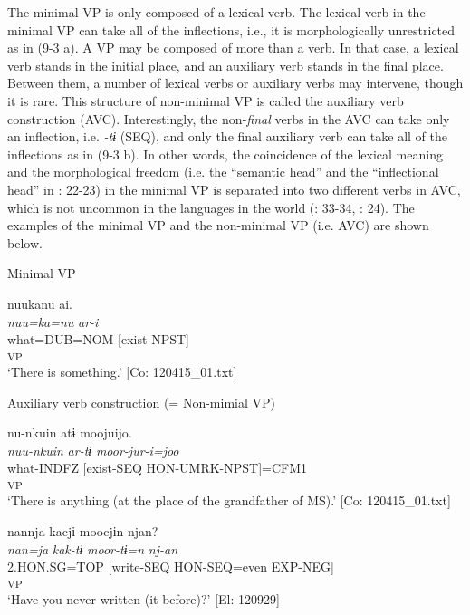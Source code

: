 The minimal VP is only composed of a lexical verb. The lexical verb in the minimal VP can take all of the inflections, i.e., it is morphologically unrestricted as in (9-3 a). A VP may be composed of more than a verb. In that case, a lexical verb stands in the initial place, and an auxiliary verb stands in the final place. Between them, a number of lexical verbs or auxiliary verbs may intervene, though it is rare. This structure of non-minimal VP is called the auxiliary verb construction (AVC). Interestingly, the non-\textit{final} verbs in the AVC can take only an inflection, i.e. \textit{{}-tɨ} (SEQ), and only the final auxiliary verb can take all of the inflections as in (9-3 b). In other words, the coincidence of the lexical meaning and the morphological freedom (i.e. the “semantic head” and the “inflectional head” in \citealt{Anderson2006}: 22-23) in the minimal VP is separated into two different verbs in AVC, which is not uncommon in the languages in the world (\citealt{Lehmann1995}: 33-34, \citealt{Anderson2006}: 24). The examples of the minimal VP and the non-minimal VP (i.e. AVC) are shown below.

\ea  \label{ex:9.4}

\exi{} Minimal VP 

\ea %
 \gllll  nuukanu  ai.\\
      \textit{nuu=ka=nu}  \textit{ar-i}\\
      what=DUB=NOM  [exist-NPST]\\
        [Lex. V]\textsubscript{VP}\\
      \glt       ‘There is something.’ [Co: 120415\_01.txt]

\exi{}  Auxiliary verb construction (= Non-mimial VP)

\ex \label{ex:.b} %
    \gllll  nu-nkuin  atɨ  moojuijo.\\
      \textit{nuu-nkuin}  \textit{ar-tɨ}  \textit{moor-jur-i=joo}\\
      what-INDFZ  [exist-SEQ  HON-UMRK-NPST]=CFM1\\
        [Lex. V  Aux. V]\textsubscript{VP}\\
      \glt       ‘There is anything (at the place of the grandfather of MS).’ [Co: 120415\_01.txt]

\ex \label{ex:.c} %
    \gllll  nannja  kacjɨ  moocjɨn  njan?\\
      \textit{nan=ja}  \textit{kak-tɨ}  \textit{moor-tɨ=n}  \textit{nj-an}\\
      2.HON.SG=TOP  [write-SEQ  HON-SEQ=even  EXP-NEG]\\
        [Lex. V  Aux. V  Aux. V]\textsubscript{VP}\\
      \glt       ‘Have you never written (it before)?’ [El: 120929]
    \z
\z

